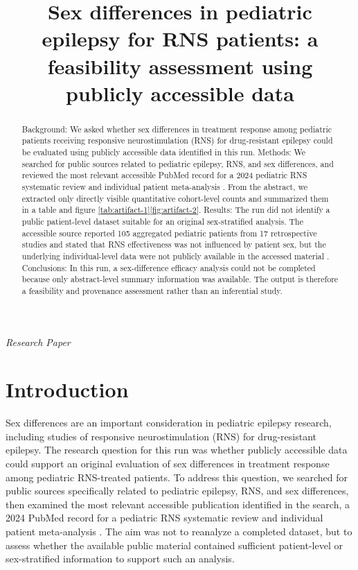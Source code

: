 \documentclass[11pt]{article}
\title{Sex differences in pediatric epilepsy for RNS patients: a feasibility assessment using publicly accessible data}
\author{}
\date{}
\begin{document}
\maketitle

\begin{center}\small\textit{Research Paper}\end{center}

\begin{abstract}

Background: We asked whether sex differences in treatment response among pediatric patients receiving responsive neurostimulation (RNS) for drug-resistant epilepsy could be evaluated using publicly accessible data identified in this run. Methods: We searched for public sources related to pediatric epilepsy, RNS, and sex differences, and reviewed the most relevant accessible PubMed record for a 2024 pediatric RNS systematic review and individual patient meta-analysis \cite{ref1}. From the abstract, we extracted only directly visible quantitative cohort-level counts and summarized them in a table and figure \ref{tab:artifact-1}\ref{fig:artifact-2}. Results: The run did not identify a public patient-level dataset suitable for an original sex-stratified analysis. The accessible source reported 105 aggregated pediatric patients from 17 retrospective studies and stated that RNS effectiveness was not influenced by patient sex, but the underlying individual-level data were not publicly available in the accessed material \cite{ref1}. Conclusions: In this run, a sex-difference efficacy analysis could not be completed because only abstract-level summary information was available. The output is therefore a feasibility and provenance assessment rather than an inferential study.

\end{abstract}

\section{Introduction}
Sex differences are an important consideration in pediatric epilepsy research, including studies of responsive neurostimulation (RNS) for drug-resistant epilepsy. The research question for this run was whether publicly accessible data could support an original evaluation of sex differences in treatment response among pediatric RNS-treated patients. To address this question, we searched for public sources specifically related to pediatric epilepsy, RNS, and sex differences, then examined the most relevant accessible publication identified in the search, a 2024 PubMed record for a pediatric RNS systematic review and individual patient meta-analysis \cite{ref1}. The aim was not to reanalyze a completed dataset, but to assess whether the available public material contained sufficient patient-level or sex-stratified information to support such an analysis.
\end{document}
